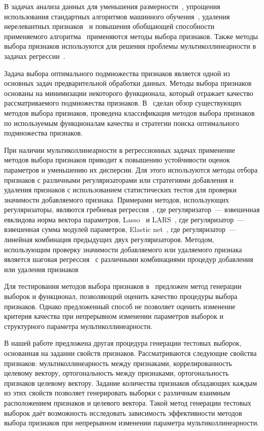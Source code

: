 \documentclass[a4paper,12pt]{article}
\begin{document}
В задачах анализа данных для уменьшения размерности~\cite{yu2003feature,strijov2012rankscale}, упрощения использования стандартных алгоритмов машинного обучения~\cite{chen2006combining}, удаления нерелевантных признаков~\cite{john1994irrelevant} и повышения обобщающей способности применяемого алгоритма~\cite{voron2008combprob} применяются методы выбора признаков. Также методы выбора признаков используются для решения проблемы мультиколлинеарности в задачах регрессии~\cite{performChong}. 

Задача выбора оптимального подмножества признаков является одной из основных задач предварительной обработки данных. Методы выбора признаков основаны на минимизации некоторого функционала, который отражает качество рассматриваемого подмножества признаков. В~\cite{introVariableFeatureSelection,
reviewFeatureSelectionOnSyntData,ladha2011feature} сделан обзор существующих методов выбора признаков, проведена классификация методов выбора признаков по используемым функционалам качества и стратегии поиска оптимального подмножества признаков.

При наличии мультиколлинеарности в регрессионных задачах применение методов выбора признаков приводит к повышению устойчивости оценок параметров и уменьшению их дисперсии. 
Для этого используются методы отбора признаков с различными регуляризаторами или стратегиями добавления и удаления признаков с использованием статистических тестов для проверки значимости добавляемого признака. Примерами методов, использующих регуляризаторы, являются гребневая регрессия~\cite{ridge}, где регуляризатор~--- взвешенная евклидова норма вектора параметров, Lasso~\cite{lasso} и LARS~\cite{lars}, где регуляризатор~--- взвешенная сумма модулей параметров, Elastic net~\cite{elnet}, где регуляризатор~--- линейная комбинация предыдущих двух регуляризаторов. Методом, использующим проверку значимости добавляемого или удаляемого признака является шаговая регрессия~\cite{stepwise} с различными комбинациями процедур добавления или удаления признаков      

Для тестирования методов выбора признаков в~\cite{performChong} предложен метод генерации выборок и функционал, позволяющий оценить качество процедуры выбора признаков. Однако предложенный способ не позволяет оценить изменение критерия качества при непрерывном изменении параметров выборок и структурного параметра мультиколлинеарности. 

В нашей работе предложена другая процедура генерации тестовых выборок, основанная на задании свойств признаков. Рассматриваются следующие свойства признаков: мультиколлинеарность между признаками, коррелированность целевому вектору, ортогональность между признаками, ортогональность признаков целевому вектору. Задание количества признаков обладающих каждым из этих свойств позволяет генерировать выборки с различным взаимным расположением признаков и целевого вектора. Такой метод генерации тестовых выборок даёт возможность исследовать зависимость эффективности методов выбора признаков при непрерывном изменении параметра мультиколлинеарности. 
\end{document}
